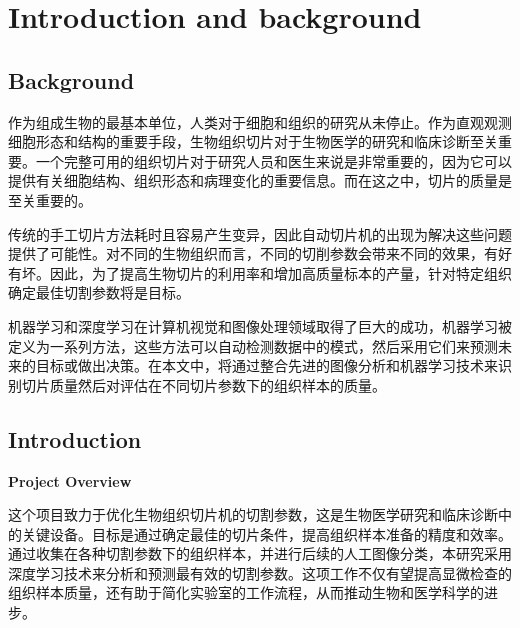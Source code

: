 \section{Introduction and background}
\label{sec:introduction}

\subsection{Background}

作为组成生物的最基本单位，人类对于细胞和组织的研究从未停止。作为直观观测细胞形态和结构的重要手段，生物组织切片对于生物医学的研究和临床诊断至关重要。一个完整可用的组织切片对于研究人员和医生来说是非常重要的，因为它可以提供有关细胞结构、组织形态和病理变化的重要信息。而在这之中，切片的质量是至关重要的。

传统的手工切片方法耗时且容易产生变异，因此自动切片机的出现为解决这些问题提供了可能性。对不同的生物组织而言，不同的切削参数会带来不同的效果，有好有坏。因此，为了提高生物切片的利用率和增加高质量标本的产量，针对特定组织确定最佳切割参数将是目标。

机器学习和深度学习在计算机视觉和图像处理领域取得了巨大的成功，机器学习被定义为一系列方法，这些方法可以自动检测数据中的模式，然后采用它们来预测未来的目标或做出决策\cite{1.1}。在本文中，将通过整合先进的图像分析和机器学习技术来识别切片质量然后对评估在不同切片参数下的组织样本的质量。


\subsection{Introduction}

\textbf{Project Overview}

这个项目致力于优化生物组织切片机的切割参数，这是生物医学研究和临床诊断中的关键设备。目标是通过确定最佳的切片条件，提高组织样本准备的精度和效率。通过收集在各种切割参数下的组织样本，并进行后续的人工图像分类，本研究采用深度学习技术来分析和预测最有效的切割参数。这项工作不仅有望提高显微检查的组织样本质量，还有助于简化实验室的工作流程，从而推动生物和医学科学的进步。


